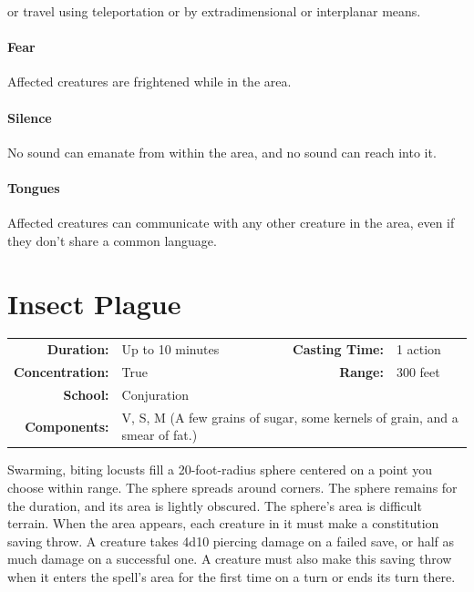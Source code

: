 \documentclass[12pt,showtrims]{memoir}
\begin{document}
or travel using teleportation or by extradimensional or interplanar means. \paragraph{Fear} Affected creatures are frightened while in the area. \paragraph{Silence} No sound can emanate from within the area, and no sound can reach into it. \paragraph{Tongues} Affected creatures can communicate with any other creature in the area, even if they don't share a common language.

\newpage
\section*{Insect Plague}

{
\small\centering\vspace{-6pt}
\begin{tabular}{rlrl}
\toprule

\textbf{Duration:} & Up to 10 minutes &
\textbf{Casting Time:} & 1 action \\
\textbf{Concentration:} & True &
\textbf{Range:} & 300 feet \\
\textbf{School:} & Conjuration \\
\textbf{Components:} & \multicolumn{3}{p{0.7\textwidth}}{V, S, M (A few grains of sugar, some kernels of grain, and a smear of fat.)}\\

\bottomrule
\end{tabular}
}

\vspace{1\baselineskip}\noindent Swarming, biting locusts fill a 20-foot-radius sphere centered on a point you choose within range. The sphere spreads around corners. The sphere remains for the duration, and its area is lightly obscured. The sphere's area is difficult terrain. When the area appears, each creature in it must make a constitution saving throw. A creature takes 4d10 piercing damage on a failed save, or half as much damage on a successful one. A creature must also make this saving throw when it enters the spell's area for the first time on a turn or ends its turn there.
\end{document}
